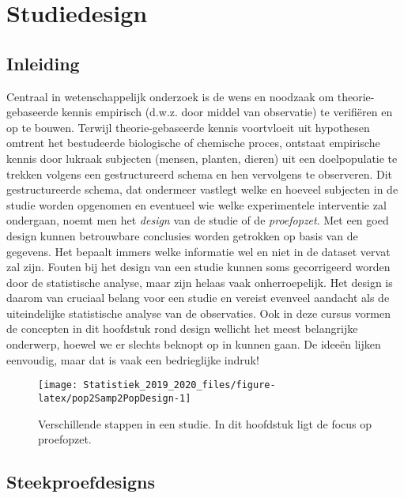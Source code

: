 \documentclass[12pt,dutch,coursenotes]{book}
\theoremstyle{definition}
\theoremstyle{definition}
\theoremstyle{definition}
\theoremstyle{remark}
\begin{document}
\chapter{Studiedesign}\label{chap:design}

\section{Inleiding}\label{inleiding-1}

Centraal in wetenschappelijk onderzoek is de wens en noodzaak om
theorie-gebaseerde kennis empirisch (d.w.z. door middel van observatie)
te verifiëren en op te bouwen. Terwijl theorie-gebaseerde kennis
voortvloeit uit hypothesen omtrent het bestudeerde biologische of
chemische proces, ontstaat empirische kennis door lukraak subjecten
(mensen, planten, dieren) uit een doelpopulatie te trekken volgens een
gestructureerd schema en hen vervolgens te observeren. Dit
gestructureerde schema, dat ondermeer vastlegt welke en hoeveel
subjecten in de studie worden opgenomen en eventueel wie welke
experimentele interventie zal ondergaan, noemt men het \emph{design} van
de studie of de \emph{proefopzet}. Met een goed design kunnen
betrouwbare conclusies worden getrokken op basis van de gegevens. Het
bepaalt immers welke informatie wel en niet in de dataset vervat zal
zijn. Fouten bij het design van een studie kunnen soms gecorrigeerd
worden door de statistische analyse, maar zijn helaas vaak
onherroepelijk. Het design is daarom van cruciaal belang voor een studie
en vereist evenveel aandacht als de uiteindelijke statistische analyse
van de observaties. Ook in deze cursus vormen de concepten in dit
hoofdstuk rond design wellicht het meest belangrijke onderwerp, hoewel
we er slechts beknopt op in kunnen gaan. De ideeën lijken eenvoudig,
maar dat is vaak een bedrieglijke indruk!

\begin{figure}

{\centering \texttt{[image: Statistiek\_2019\_2020\_files/figure-latex/pop2Samp2PopDesign-1]} 

}

\caption{Verschillende stappen in een studie. In dit hoofdstuk ligt de focus op proefopzet.}\label{fig:pop2Samp2PopDesign}
\end{figure}

\section{Steekproefdesigns}\label{sec:steekproefdesigns}
\end{document}

